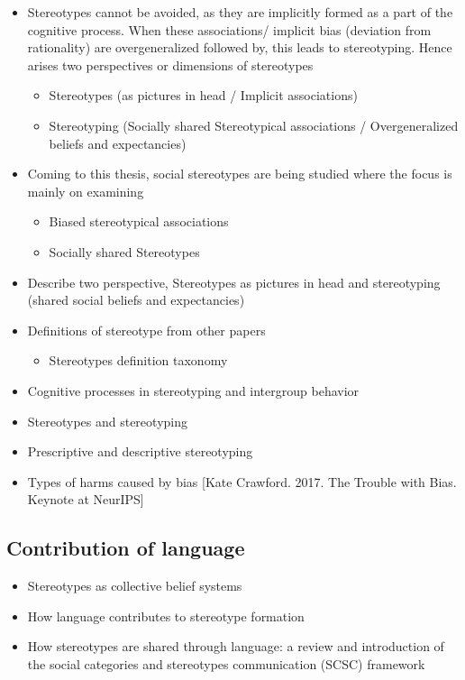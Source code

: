 \begin{itemize}
        \item Stereotypes cannot be avoided, as they are implicitly formed as a part of the cognitive process. When these associations/ implicit bias (deviation from rationality) are overgeneralized followed by, this leads to stereotyping. Hence arises two perspectives or dimensions of stereotypes 
            \begin{itemize}
                \item Stereotypes (as pictures in head / Implicit associations)
                \item Stereotyping (Socially shared Stereotypical associations / Overgeneralized beliefs and expectancies) 
            \end{itemize}
            \item Coming to this thesis, social stereotypes are being studied where the focus is mainly on examining 
            \begin{itemize}
                \item Biased stereotypical associations
                \item Socially shared Stereotypes
            \end{itemize}
\end{itemize}
\begin{itemize}
    \item Describe two perspective, Stereotypes as pictures in head and stereotyping (shared social beliefs and expectancies)
    \item Definitions of stereotype from other papers
        \begin{itemize}
            \item Stereotypes definition taxonomy \cite{ashmore1981conceptual}
        \end{itemize}
    \item Cognitive processes in stereotyping and intergroup behavior \cite{hamilton2015cognitive}
    \item Stereotypes and stereotyping \cite{macrae1996stereotypes}
    \item Prescriptive and descriptive stereotyping
    \item Types of harms caused by bias [Kate Crawford. 2017. The Trouble with Bias. Keynote
at NeurIPS]
\end{itemize}
\subsection{Contribution of language}
    \begin{itemize}
        \item Stereotypes as collective belief systems \cite{macrae1996stereotypes}
        \item How language contributes to stereotype formation \cite{burgers2020language}
        \item How stereotypes are shared through language: a
    review and introduction of the social categories
    and stereotypes communication (SCSC) framework \cite{beukeboom2019stereotypes}
    \end{itemize}
    \pagebreak

